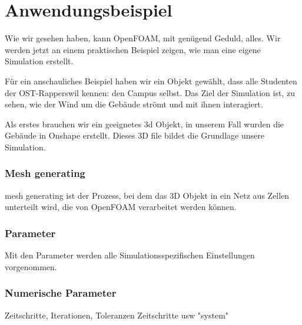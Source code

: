 %
%
%
%
\section{Anwendungsbeispiel
\label{openfoam:section:Anwendungsbeispiel}}
Wie wir gesehen haben, kann OpenFOAM, mit genügend Geduld, alles. 
Wir werden jetzt an einem praktischen Beispiel zeigen, wie man eine eigene Simulation erstellt.

Für ein anschauliches Beispiel haben wir ein Objekt gewählt, dass alle Studenten der OST-Rapperswil kennen: den Campus selbst.
Das Ziel der Simulation ist, zu sehen, wie der Wind um die Gebäude strömt und mit ihnen interagiert.

Als erstes brauchen wir ein geeignetes 3d Objekt, in unserem Fall wurden die Gebäude in Onshape erstellt.
Dieses 3D file bildet die Grundlage unsere Simulation.

\subsubsection{Mesh generating\label{openfoam:section:Mesh generating}}
mesh generating ist der Prozess, bei dem das 3D Objekt in ein Netz aus Zellen unterteilt wird, die von OpenFOAM verarbeitet werden können.


\subsubsection{Parameter\label{openfoam:section:Parameter}}
Mit den Parameter werden alle Simulationsspezifischen Einstellungen vorgenommen.

\subsubsection{Numerische Parameter\label{openfoam:section:Numerische Parameter}}
Zeitschritte, Iterationen, Toleranzen   
Zeitschritte usw "system"

